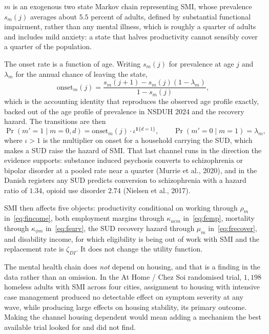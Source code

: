 \documentclass[10pt]{article}
\begin{document}
$m$ is an exogenous two state Markov chain representing SMI, whose
prevalence $s_m(j)$ averages about $5.5$ percent of adults, defined by substantial functional
impairment, rather than any mental illness, which is roughly a quarter of adults
and includes mild anxiety: a state that halves productivity cannot sensibly cover
a quarter of the population.

The onset rate is a function of age.
Writing $s_m(j)$ for prevalence at age $j$ and $\lambda_m$ for the annual chance of
leaving the state,
\begin{equation}\label{eq:fonsetage}
\text{onset}_m(j)=\frac{s_m(j{+}1)-s_m(j)(1-\lambda_m)}{1-s_m(j)},
\end{equation}
which is the accounting identity that reproduces the observed age
profile exactly, backed out of the age profile of prevalence in NSDUH 2024 and the
recovery hazard. The transitions are then
\begin{equation}\label{eq:fonset}
\Pr(m'=1\mid m=0,d)=\text{onset}_m(j)\cdot\iota^{\mathbf{1}\{d=1\}},
\qquad
\Pr(m'=0\mid m=1)=\lambda_m,
\end{equation}
where $\iota>1$ is the multiplier on onset for a household carrying the SUD,
which makes a SUD raise the hazard of SMI. That last channel runs in the
direction the evidence supports: substance induced psychosis converts to
schizophrenia or bipolar disorder at a pooled rate near a quarter
(Murrie et al., 2020), and in the
Danish registers any SUD predicts conversion to schizophrenia
with a hazard ratio of $1.34$, opioid use disorder $2.74$
(Nielsen et al., 2017).

SMI then affects five objects: productivity conditional on working
through $\rho_m$ in~\eqref{eq:fincome}, both employment margins through
$\kappa_{uem}$ in~\eqref{eq:femp}, mortality through $\kappa_{\phi m}$
in~\eqref{eq:fsurv}, the SUD recovery hazard through
$\mu_m$ in~\eqref{eq:frecover}, and
disability income, for which eligibility is being out of work with SMI and
the replacement rate is $\zeta_{DI}$. It does not change the utility function.

The mental health chain does \emph{not} depend on housing, and that is
a finding in the data rather than an omission. In the At Home / Chez Soi randomised trial, $1{,}198$
homeless adults with SMI across four cities, assignment to housing
with intensive case management produced no detectable effect on symptom severity
at any wave, while producing large effects on housing stability, its primary
outcome. Making the channel housing dependent would mean adding a mechanism the
best available trial looked for and did not find.
\end{document}
